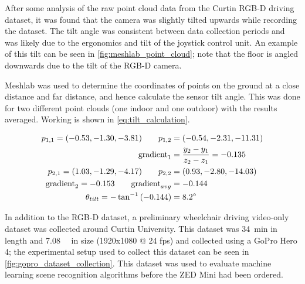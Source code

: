 After some analysis of the raw point cloud data from the Curtin RGB-D driving dataset,
it was found that the camera was slightly tilted upwards while recording the dataset.
The tilt angle was consistent between data collection periods
and was likely due to the ergonomics and tilt of the joystick control unit.
An example of this tilt can be seen in \cref{fig:meshlab_point_cloud}; note
that the floor is angled downwards due to the tilt of the RGB-D camera.

Meshlab was used to determine the coordinates of points
on the ground at a close distance and far distance, and hence calculate the
sensor tilt angle.
This was done for two different point clouds (one indoor and one outdoor)
with the results averaged. Working is shown in \cref{eq:tilt_calculation}.

\begin{equation}
\begin{split}
p_{1,1} = (-0.53, -1.30, -3.81) \qquad p_{1,2} &= (-0.54, -2.31, -11.31)\\
\textrm{gradient}_1 &= \frac{y_2 - y_1}{z_2 - z_1} = -0.135\\
p_{2,1} = (1.03, -1.29, -4.17) \qquad p_{2,2} &= (0.93, -2.80, -14.03)\\
\textrm{gradient}_2 = -0.153 \qquad \textrm{gradient}_{avg} &= -0.144\\
\theta_{tilt} = -\tan^{-1}\left(-0.144\right) &= 8.2\degree
\end{split}
\label{eq:tilt_calculation}
\end{equation}

In addition to the RGB-D dataset, a preliminary wheelchair driving video-only dataset was collected around
Curtin University.
This dataset was \SI{34}{\minute} in length and \SI{7.08}{\giga\byte} in size (1920x1080 @ 24 fps)
and collected using a GoPro Hero 4; the experimental setup used to collect this
dataset can be seen in \cref{fig:gopro_dataset_collection}.
This dataset was used to evaluate machine learning scene recognition algorithms
before the ZED Mini had been ordered.

